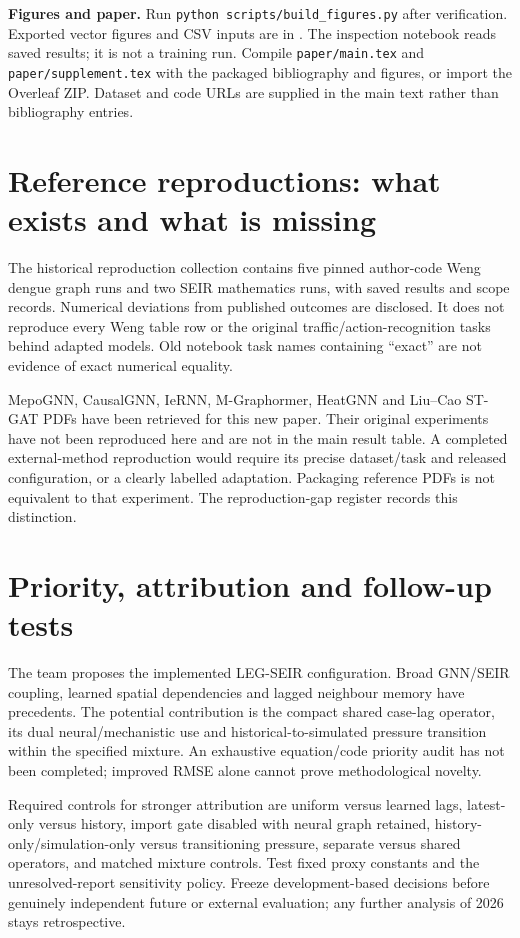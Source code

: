 \documentclass[11pt]{article}
\begin{document}
\textbf{Figures and paper.} Run \texttt{python scripts/build\_figures.py} after verification. Exported vector figures and CSV inputs are in . The inspection notebook reads saved results; it is not a training run. Compile \texttt{paper/main.tex} and \texttt{paper/supplement.tex} with the packaged bibliography and figures, or import the Overleaf ZIP. Dataset and code URLs are supplied in the main text rather than bibliography entries.

\section{Reference reproductions: what exists and what is missing}
The historical reproduction collection contains five pinned author-code Weng dengue graph runs and two SEIR mathematics runs, with saved results and scope records. Numerical deviations from published outcomes are disclosed. It does not reproduce every Weng table row or the original traffic/action-recognition tasks behind adapted models. Old notebook task names containing ``exact'' are not evidence of exact numerical equality.

MepoGNN, CausalGNN, IeRNN, M-Graphormer, HeatGNN and Liu--Cao ST-GAT PDFs have been retrieved for this new paper. Their original experiments have not been reproduced here and are not in the main result table. A completed external-method reproduction would require its precise dataset/task and released configuration, or a clearly labelled adaptation. Packaging reference PDFs is not equivalent to that experiment. The reproduction-gap register records this distinction.

\section{Priority, attribution and follow-up tests}
The team proposes the implemented LEG-SEIR configuration. Broad GNN/SEIR coupling, learned spatial dependencies and lagged neighbour memory have precedents. The potential contribution is the compact shared case-lag operator, its dual neural/mechanistic use and historical-to-simulated pressure transition within the specified mixture. An exhaustive equation/code priority audit has not been completed; improved RMSE alone cannot prove methodological novelty.

Required controls for stronger attribution are uniform versus learned lags, latest-only versus history, import gate disabled with neural graph retained, history-only/simulation-only versus transitioning pressure, separate versus shared operators, and matched mixture controls. Test fixed proxy constants and the unresolved-report sensitivity policy. Freeze development-based decisions before genuinely independent future or external evaluation; any further analysis of 2026 stays retrospective. 
\end{document}
